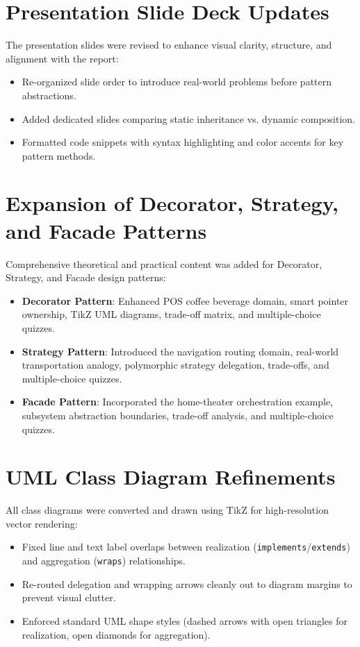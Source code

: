 \documentclass[11pt,a4paper]{report}
\begin{document}
\section{Presentation Slide Deck Updates}
The presentation slides were revised to enhance visual clarity, structure, and alignment with the report:
\begin{itemize}
  \item Re-organized slide order to introduce real-world problems before pattern abstractions.
  \item Added dedicated slides comparing static inheritance vs. dynamic composition.
  \item Formatted code snippets with syntax highlighting and color accents for key pattern methods.
\end{itemize}

\section{Expansion of Decorator, Strategy, and Facade Patterns}
Comprehensive theoretical and practical content was added for Decorator, Strategy, and Facade design patterns:
\begin{itemize}
  \item \textbf{Decorator Pattern}: Enhanced POS coffee beverage domain, smart pointer ownership, TikZ UML diagrams, trade-off matrix, and multiple-choice quizzes.
  \item \textbf{Strategy Pattern}: Introduced the navigation routing domain, real-world transportation analogy, polymorphic strategy delegation, trade-offs, and multiple-choice quizzes.
  \item \textbf{Facade Pattern}: Incorporated the home-theater orchestration example, subsystem abstraction boundaries, trade-off analysis, and multiple-choice quizzes.
\end{itemize}

\section{UML Class Diagram Refinements}
All class diagrams were converted and drawn using TikZ for high-resolution vector rendering:
\begin{itemize}
  \item Fixed line and text label overlaps between realization (\texttt{implements}/\texttt{extends}) and aggregation (\texttt{wraps}) relationships.
  \item Re-routed delegation and wrapping arrows cleanly out to diagram margins to prevent visual clutter.
  \item Enforced standard UML shape styles (dashed arrows with open triangles for realization, open diamonds for aggregation).
\end{itemize}
\end{document}
